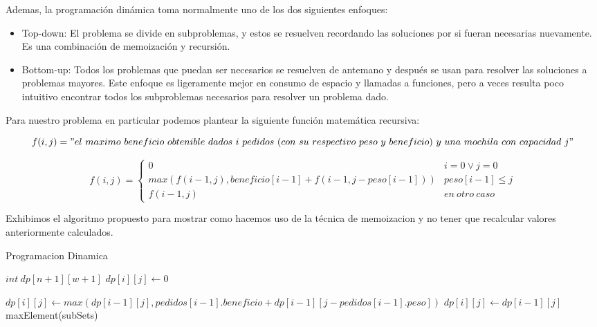 Ademas, la programación dinámica toma normalmente uno de los dos siguientes enfoques:
\begin{itemize}
	\item Top-down: El problema se divide en subproblemas, y estos se resuelven recordando las soluciones por si fueran necesarias nuevamente. Es una combinación de memoización y recursión.
	\item Bottom-up: Todos los problemas que puedan ser necesarios se resuelven de antemano y después se usan para resolver las soluciones a problemas mayores. Este enfoque es ligeramente mejor en consumo de espacio y llamadas a funciones, pero a veces resulta poco intuitivo encontrar todos los subproblemas necesarios para resolver un problema dado.
\end{itemize}


Para nuestro problema en particular podemos plantear la siguiente función matemática recursiva:

\begin{equation*}
f(i,j) = "el\ maximo\ beneficio\ obtenible\ dados\ i\ pedidos\ (con\ su\ respectivo\ peso\ y\ beneficio)\ y\ una\ mochila\ con\ capacidad\ j"
\end{equation*}

\begin{equation*}
	f(i,j) = \begin{cases} 
          0 & i = 0 \lor j = 0 \\
          max(f(i-1,j), beneficio[i-1] + f(i-1, j-peso[i-1])) & peso[i-1] \leq j \\
          f(i-1, j) & en\ otro\ caso
       \end{cases}
\end{equation*}

Exhibimos el algoritmo propuesto para mostrar como hacemos uso de la técnica de memoizacion y no tener que recalcular valores anteriormente calculados.

\begin{algorithm}
\caption{Programacion Dinamica}\label{selection}
\begin{algorithmic}[1]
	\State $int \ dp[n+1][w+1]$
    				\State $dp[i][j] \gets 0$
    			
    			\Else
					\State $dp[i][j] \gets max(dp[i-1][j], pedidos[i-1].beneficio + dp[i-1][j-pedidos[i-1].peso])$
				\Else
					\State $dp[i][j] \gets dp[i-1][j]$
				\EndIf
			\EndIf
		\EndFor
    \EndFor
   	\Return maxElement(subSets)
\EndProcedure
\end{algorithmic}
\end{algorithm}

